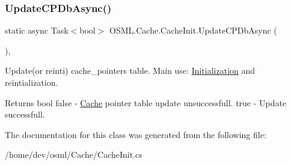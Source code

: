 \subsubsection{\texorpdfstring{UpdateCPDbAsync()}{UpdateCPDbAsync()}}
{\footnotesize\ttfamily static async Task$<$bool$>$ O\+S\+M\+L.\+Cache.\+Cache\+Init.\+Update\+C\+P\+Db\+Async (\begin{DoxyParamCaption}{ }\end{DoxyParamCaption})\hspace{0.3cm}{\ttfamily [inline]}, {\ttfamily [static]}}



Update(or reinti) cache\+\_\+pointers table. Main use\+: \mbox{\hyperlink{classOSML_1_1Initialization}{Initialization}} and reintialization. 

\begin{DoxyReturn}{Returns}
bool false -\/ \mbox{\hyperlink{namespaceOSML_1_1Cache}{Cache}} pointer table update unsuccessfull. true -\/ Update successfull. 
\end{DoxyReturn}


The documentation for this class was generated from the following file\+:\begin{DoxyCompactItemize}
\item 
/home/dev/osml/\+Cache/Cache\+Init.\+cs\end{DoxyCompactItemize}
